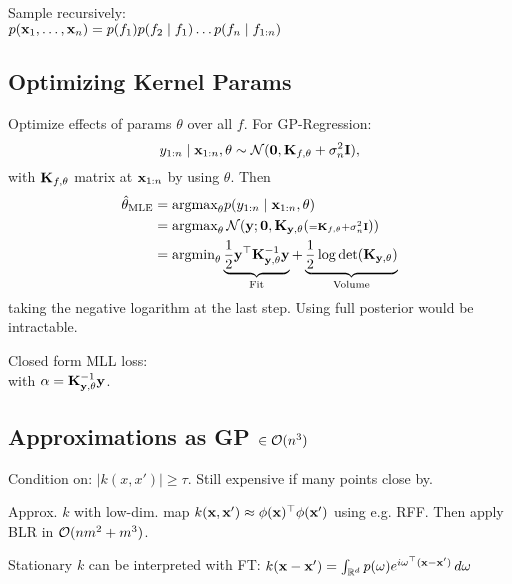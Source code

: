 \vspace{-8pt}
\begin{definition}
    Sample recursively: \\
    \(p(\vb{x}_1, \ldots, \vb{x}_n) = p(f_1)p(f_2 \mid f_1)\ldots p(f_n \mid f_{1:n})\)
\end{definition}

\subsection{Optimizing Kernel Params}

\begin{definition}
    Optimize effects of params \(\theta\) over all \(f\). For GP-Regression:
    \[y_{1:n} \mid \vb{x}_{1:n}, \theta \sim \operatorname{\mathcal{N}}(\vb{0}, \vb{K}_{f, \theta} + \sigma_n^2\vb{I}),\]
    with \(\vb{K}_{f, \theta}\) matrix at \(\vb{x}_{1:n}\) by using \(\theta\). Then
    \begin{align*}
        \hat\theta_{\text{MLE}} &= \text{argmax}_{\theta} p(y_{1:n} \mid \vb{x}_{1:n}, \theta) \\
        &=\text{argmax}_{\theta} \operatorname{\mathcal{N}}(\vb{y}; \vb{0}, \vb{K}_{\vb{y}, \theta} ({\scriptstyle = \vb{K}_{f, \theta} + \sigma_n^2\vb{I}})) \\
        &= \text{argmin}_{\theta} \underbrace{\frac{1}{2}\vb{y}^\top \vb{K}_{\vb{y}, \theta}^{-1} \vb{y}}_{\text{Fit}} + \underbrace{\frac{1}{2} \log\det(\vb{K}_{\vb{y}, \theta})}_{\text{Volume}}
    \end{align*}
    taking the negative logarithm at the last step.
    Using full posterior would be intractable.
\end{definition}

\begin{definition}
    Closed form MLL loss: \\
    with \(\vb{\alpha} = \vb{K}_{\vb{y}, \theta}^{-1}\vb{y}\).
\end{definition}

\subsection{Approximations as GP \(\in \mathcal{O}(n^3)\)}

\begin{definition}
    Condition on: \(|k(x, x')| \geq \tau\). Still expensive if many points close by.
\end{definition}

\begin{definition}
    Approx. \(k\) with low-dim. map  \(k(\vb{x},\vb{x}') \approx \phi(\vb{x})^\top\phi(\vb{x}')\) using e.g. RFF.
    Then apply BLR in \(\mathcal{O}(nm^2 + m^3)\).
\end{definition}

\begin{definition}[RFF]
    Stationary \(k\) can be interpreted with FT: \(k(\vb{x}-\vb{x}') = \int_{\mathbb{R}^d} p(\omega) e^{i \omega^\top(\vb{x} - \vb{x}')} \, d\omega\) 
\end{definition}
